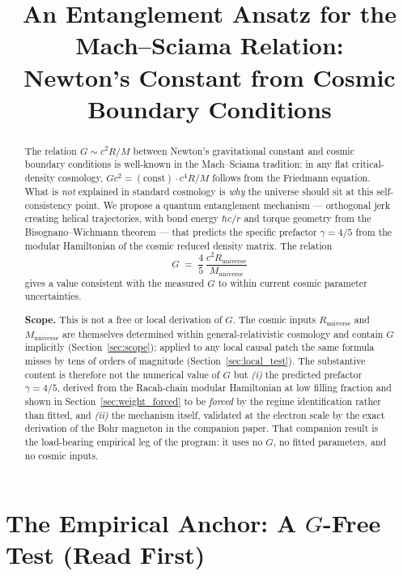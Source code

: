 \documentclass[11pt,letterpaper]{article}
\title{An Entanglement Ansatz for the Mach--Sciama Relation:\\
Newton's Constant from Cosmic Boundary Conditions}
\author{}
\date{}
\newcommand{\Runiv}{R_{\mathrm{universe}}}
\newcommand{\Muniv}{M_{\mathrm{universe}}}
\begin{document}
\maketitle

\begin{abstract}
The relation $G \sim c^2 R/M$ between Newton's gravitational constant and
cosmic boundary conditions is well-known in the Mach--Sciama tradition: in
any flat critical-density cosmology, $G c^2 = (\text{const}) \cdot c^4 R/M$
follows from the Friedmann equation. What is \emph{not} explained in standard
cosmology is \emph{why} the universe should sit at this self-consistency point.
We propose a quantum entanglement mechanism --- orthogonal jerk creating
helical trajectories, with bond energy $\hbar c/r$ and torque geometry from
the Bisognano--Wichmann theorem --- that predicts the specific prefactor
$\gamma = 4/5$ from the modular Hamiltonian of the cosmic reduced density
matrix. The relation
\begin{equation}
  G \;=\; \frac{4}{5}\,\frac{c^2 \Runiv}{\Muniv}
\end{equation}
gives a value consistent with the measured $G$ to within current cosmic
parameter uncertainties.

\textbf{Scope.} This is not a free or local derivation of $G$. The
cosmic inputs $\Runiv$ and $\Muniv$ are themselves determined within
general-relativistic cosmology and contain $G$ implicitly
(Section~\ref{sec:scope}); applied to any local causal patch the
same formula misses by tens of orders of magnitude
(Section~\ref{sec:local_test}). The substantive content is therefore
not the numerical value of $G$ but \emph{(i)} the predicted prefactor
$\gamma = 4/5$, derived from the Racah-chain modular Hamiltonian at
low filling fraction and shown in
Section~\ref{sec:weight_forced} to be \emph{forced} by the regime
identification rather than fitted, and \emph{(ii)} the mechanism
itself, validated at the electron scale by the exact derivation of
the Bohr magneton in the companion paper. That companion result is
the load-bearing empirical leg of the program: it uses no $G$, no
fitted parameters, and no cosmic inputs.
\end{abstract}

\section*{The Empirical Anchor: A $G$-Free Test (Read First)}
\end{document}
